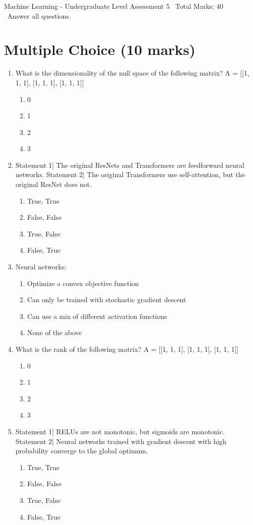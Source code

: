 \documentclass[12pt]{article}
\begin{document}
\begin{center}
Machine Learning - Undergraduate Level Assessment 5 \
Total Marks: 40 \
Answer all questions.
\end{center}

\section*{Multiple Choice (10 marks)}
\begin{enumerate}[label=\arabic*.]
\item What is the dimensionality of the null space of the following matrix? A = [[1, 1, 1], [1, 1, 1], [1, 1, 1]]
\begin{enumerate}[label=(\alph*)]
    \item 0
    \item 1
    \item 2
    \item 3
\end{enumerate}
\item Statement 1| The original ResNets and Transformers are feedforward neural networks. Statement 2| The original Transformers use self-attention, but the original ResNet does not.
\begin{enumerate}[label=(\alph*)]
    \item True, True
    \item False, False
    \item True, False
    \item False, True
\end{enumerate}
\item Neural networks:
\begin{enumerate}[label=(\alph*)]
    \item Optimize a convex objective function
    \item Can only be trained with stochastic gradient descent
    \item Can use a mix of different activation functions
    \item None of the above
\end{enumerate}
\item What is the rank of the following matrix? A = [[1, 1, 1], [1, 1, 1], [1, 1, 1]]
\begin{enumerate}[label=(\alph*)]
    \item 0
    \item 1
    \item 2
    \item 3
\end{enumerate}
\item Statement 1| RELUs are not monotonic, but sigmoids are monotonic. Statement 2| Neural networks trained with gradient descent with high probability converge to the global optimum.
\begin{enumerate}[label=(\alph*)]
    \item True, True
    \item False, False
    \item True, False
    \item False, True
\end{enumerate}
\end{enumerate}
\end{document}
